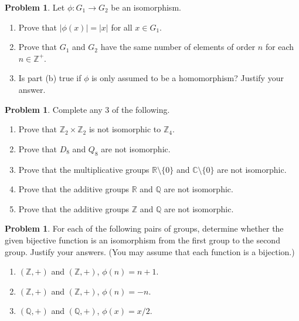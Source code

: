 \documentclass[11pt]{scrartcl}
\theoremstyle{definition}
\newtheorem{problem}[theorem]{Problem}
\begin{document}
\begin{problem}
Let $\phi:G_1\to G_2$ be an isomorphism.
\begin{enumerate}[label=\rm{(\alph*)}]
\item Prove that $|\phi(x)|=|x|$ for all $x\in G_1$.
\item Prove that $G_1$ and $G_2$ have the same number of elements of order $n$ for each $n\in\mathbb{Z}^+$.
\item Is part (b) true if $\phi$ is only assumed to be a homomorphism?  Justify your answer.\end{enumerate}
\end{problem}

\begin{problem}
Complete any 3 of the following.
\begin{enumerate}[label=\rm{(\alph*)}]
\item Prove that $\mathbb{Z}_2\times \mathbb{Z}_2$ is not isomorphic to $\mathbb{Z}_4$.
\item Prove that $D_8$ and $Q_8$ are not isomorphic.
\item Prove that the multiplicative groups $\mathbb{R}\setminus\{0\}$ and $\mathbb{C}\setminus\{0\}$ are not isomorphic.
\item Prove that the additive groups $\mathbb{R}$ and $\mathbb{Q}$ are not isomorphic.
\item Prove that the additive groups $\mathbb{Z}$ and $\mathbb{Q}$ are not isomorphic.
\end{enumerate}
\end{problem}

\begin{problem}
For each of the following pairs of groups, determine whether the given bijective function is an isomorphism from the first group to the second group. Justify your answers. (You may assume that each function is a bijection.)
\begin{enumerate}[label=\rm{(\alph*)}]
\item $(\mathbb{Z},+)$ and $(\mathbb{Z},+)$, $\phi(n)=n+1$.
\item $(\mathbb{Z},+)$ and $(\mathbb{Z},+)$, $\phi(n)=-n$.
\item $(\mathbb{Q},+)$ and $(\mathbb{Q},+)$, $\phi(x)=x/2$.
\end{enumerate}
\end{problem}

%
\end{document}
